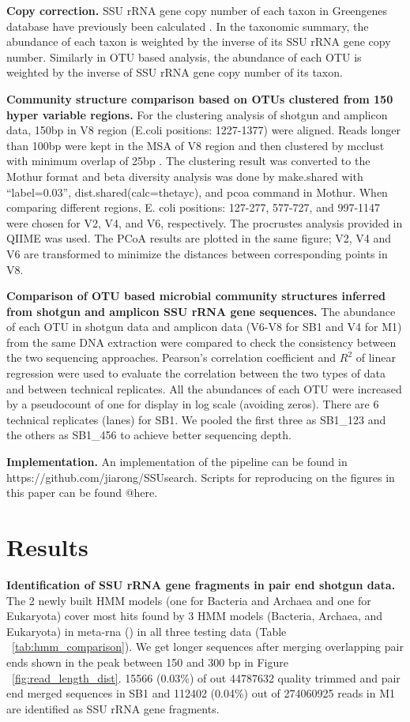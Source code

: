 \documentclass[12pt]{article}
\begin{document}
{\bf Copy correction.} SSU rRNA gene copy number of each taxon in
Greengenes database have previously been calculated
\cite{copyrighter}. In the taxonomic summary, the abundance of each
taxon is weighted by the inverse of its SSU rRNA gene copy
number. Similarly in OTU based analysis, the abundance of each OTU is
weighted by the inverse of SSU rRNA gene copy number of its taxon.

{\bf Community structure comparison based on OTUs clustered from 150
hyper variable regions.} For the clustering analysis of shotgun and
amplicon data, 150bp in V8 region (E.coli positions: 1227-1377) were
aligned. Reads longer than 100bp were kept in the MSA of V8 region and
then clustered by mcclust with minimum overlap of 25bp
\cite{rdp2009}. The clustering result was converted to the Mothur format
and beta diversity analysis was done by make.shared with
``label=0.03'', dist.shared(calc=thetayc), and pcoa command in
Mothur. When comparing different regions, E. coli positions: 127-277,
577-727, and 997-1147 were chosen for V2, V4, and V6,
respectively. The procrustes analysis provided in QIIME \cite{qiime}
was used. The PCoA results are plotted in the same figure; V2, V4 and
V6 are transformed to minimize the distances between corresponding
points in V8.

{\bf Comparison of OTU based microbial community structures inferred
from shotgun and amplicon SSU rRNA gene sequences.} The abundance of each
OTU in shotgun data and amplicon data (V6-V8 for SB1 and V4 for M1)
from the same DNA extraction were compared to check the consistency
between the two sequencing approaches. Pearson's correlation
coefficient and $R^2$ of linear regression were used to evaluate the
correlation between the two types of data and between 
technical replicates. All the abundances of each OTU were increased by
a pseudocount of one for display in log scale (avoiding zeros). There are
6 technical replicates (lanes) for SB1. We pooled the first three as
SB1\_123 and the others as SB1\_456 to achieve better sequencing
depth.

{\bf Implementation.} An implementation of the pipeline can be found
in https://github.com/jiarong/SSUsearch. Scripts for reproducing on
the figures in this paper can be found @here.

\section{Results}

{\bf Identification of SSU rRNA gene fragments in pair end shotgun
data. } The 2 newly built HMM models (one for Bacteria and Archaea and
one for Eukaryota) cover most hits found by 3 HMM models (Bacteria,
Archaea, and Eukaryota) in meta-rna (\cite{metarna}) in all three
testing data (Table ~\ref{tab:hmm_comparison}). We get longer
sequences after merging overlapping pair ends shown in the peak
between 150 and 300 bp in Figure ~\ref{fig:read_length_dist}. 15566
(0.03\%) of out 44787632 quality trimmed and pair end merged sequences
in SB1 and 112402 (0.04\%) out of 274060925 reads in M1 are identified
as SSU rRNA gene fragments.
\end{document}
